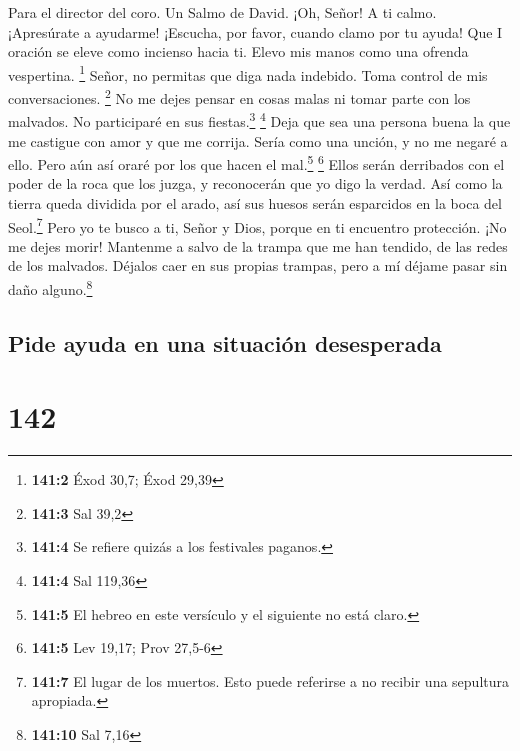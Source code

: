 Para el director del coro. Un Salmo de David.  ¡Oh, Señor!
A ti calmo. ¡Apresúrate a ayudarme! ¡Escucha, por favor, cuando clamo
por tu ayuda!  Que I oración se eleve como incienso hacia
ti. Elevo mis manos como una ofrenda vespertina. \footnote{\textbf{141:2}
  Éxod 30,7; Éxod 29,39}  Señor, no permitas que diga nada
indebido. Toma control de mis conversaciones. \footnote{\textbf{141:3}
  Sal 39,2}  No me dejes pensar en cosas malas ni tomar
parte con los malvados. No participaré en sus fiestas.\footnote{\textbf{141:4}
  Se refiere quizás a los festivales paganos.} \footnote{\textbf{141:4}
  Sal 119,36}  Deja que sea una persona buena la que me
castigue con amor y que me corrija. Sería como una unción, y no me
negaré a ello. Pero aún así oraré por los que hacen el mal.\footnote{\textbf{141:5}
  El hebreo en este versículo y el siguiente no está claro.} \footnote{\textbf{141:5}
  Lev 19,17; Prov 27,5-6}  Ellos serán derribados con el
poder de la roca que los juzga, y reconocerán que yo digo la verdad.
 Así como la tierra queda dividida por el arado, así sus
huesos serán esparcidos en la boca del Seol.\footnote{\textbf{141:7} El
  lugar de los muertos. Esto puede referirse a no recibir una sepultura
  apropiada.}  Pero yo te busco a ti, Señor y Dios, porque
en ti encuentro protección. ¡No me dejes morir!  Mantenme
a salvo de la trampa que me han tendido, de las redes de los malvados.
 Déjalos caer en sus propias trampas, pero a mí déjame
pasar sin daño alguno.\footnote{\textbf{141:10} Sal 7,16}

\hypertarget{pide-ayuda-en-una-situaciuxf3n-desesperada}{%
\subsection{Pide ayuda en una situación
desesperada}\label{pide-ayuda-en-una-situaciuxf3n-desesperada}}

\hypertarget{section-141}{%
\section{142}\label{section-141}}

